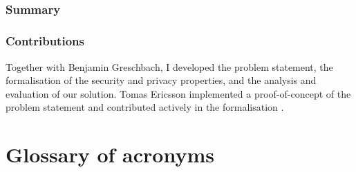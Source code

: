 \documentclass[showtrims, oldfontcommands]{kthesis}
\begin{document}
\section{}
\begingroup\centering
\begin{ppBox}
\end{ppBox}
\endgroup

\subsection{Summary}


\subsection{Contributions}
Together with Benjamin Greschbach, I developed the problem statement, the formalisation 
of the security and privacy properties, and the analysis and evaluation of our solution. 
Tomas Ericsson implemented a proof-of-concept of the problem statement and contributed 
actively in the formalisation \cite{Ericsson15}.


\renewcommand\thesection{\thechapter.\arabic{section}}






\chapter{Glossary of acronyms}
\end{document}
